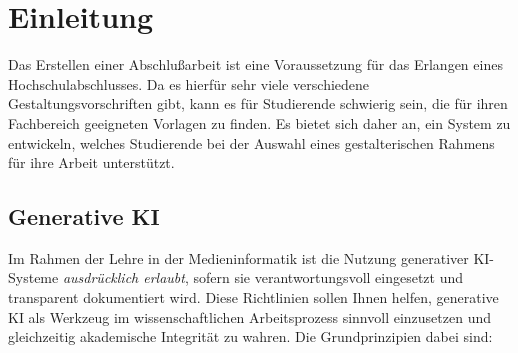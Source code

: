 \documentclass[11pt,        %
  english,ngerman,          %
  paper=a4,                 %
  captions=tablesignature,  %
  listof=numbered,          %
  bibliography=totoc,       %
  headings=small,           %
  headinclude=false,        %
  footinclude=false,        %
  parskip=half-,            %
  oneside,                  %
  BCOR=15mm,                 %
  DIV=12                    %
  ]{scrbook}                %
\begin{document}
\clearpage
\setcounter{tocdepth}{1}
\tableofcontents

\mainmatter

\chapter{Einleitung}\label{chapter:introduction}


Das Erstellen einer Abschlußarbeit ist eine Voraussetzung für das Erlangen eines Hochschulabschlusses. Da es hierfür sehr viele verschiedene  Gestaltungsvorschriften gibt, kann es für Studierende schwierig sein, die  für ihren Fachbereich geeigneten Vorlagen zu finden. Es bietet sich daher  an, ein System zu entwickeln, welches Studierende bei der Auswahl eines  gestalterischen Rahmens für ihre Arbeit unterstützt.

\section{Generative KI}

  
Im Rahmen der Lehre in der Medieninformatik ist die Nutzung generativer KI-Systeme \textit{ausdrücklich erlaubt}, sofern sie verantwortungsvoll eingesetzt und transparent dokumentiert wird. Diese Richtlinien sollen Ihnen helfen, generative KI als Werkzeug im wissenschaftlichen Arbeitsprozess sinnvoll einzusetzen und gleichzeitig akademische Integrität zu wahren. Die Grundprinzipien dabei sind:
    
\end{document}
